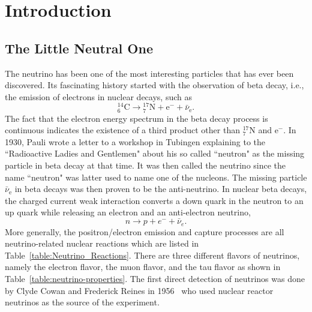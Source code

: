 \chapter{Introduction}
\label{introduction}

\section{The Little Neutral One}

The neutrino has been one of the most interesting particles that has ever been discovered. Its fascinating history started with the observation of beta decay, i.e., the emission of electrons in nuclear decays, such as
\begin{equation*}
{}^{14}_{6} \mathrm C \to {}^{17}_{7}\mathrm N + \mathrm e^{-} + \bar\nu_{\mathrm e}.
\end{equation*}
The fact that the electron energy spectrum in the beta decay process is continuous indicates the existence of a third product other than ${}^{17}_{7}\mathrm N$ and $\mathrm e^-$. In 1930, Pauli wrote a letter to a workshop in Tubingen explaining to the ``Radioactive Ladies and Gentlemen" about his so called ``neutron" as the missing particle in beta decay at that time. It was then called the neutrino since the name ``neutron" was latter used to name one of the nucleons. The missing particle $\bar\nu_{\mathrm e}$ in beta decays was then proven to be the anti-neutrino. In nuclear beta decays, the charged current weak interaction converts a down quark in the neutron to an up quark while releasing an electron and an anti-electron neutrino,
\begin{equation}
n\to p + e^- + \bar \nu_e .
\end{equation}
More generally, the positron/electron emission and capture processes are all neutrino-related nuclear reactions which are listed in Table~\ref{table:Neutrino_Reactions}. There are three different flavors of neutrinos, namely the electron flavor, the muon flavor, and the tau flavor as shown in Table~\ref{table:neutrino-properties}. The first direct detection of neutrinos was done by Clyde Cowan and Frederick Reines in 1956~\cite{Cowan1956} who used nuclear reactor neutrinos as the source of the experiment.

